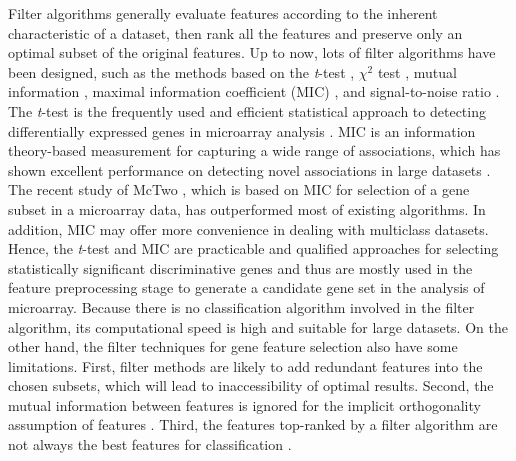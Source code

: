 \documentclass[10pt,journal,compsoc]{IEEEtran}
\begin{document}
	Filter algorithms generally evaluate features according to the inherent characteristic of a dataset, then rank all the features and preserve only an optimal subset of the original features. Up to now, lots of filter algorithms have been designed, such as the methods based on the \textit{t}-test \cite{W23}, $\chi^2$ test \cite{W21}, mutual information \cite{W22}, maximal information coefficient (MIC) \cite{W25}, and signal-to-noise ratio \cite{W24}. The \textit{t}-test is the frequently used and efficient statistical approach to detecting differentially expressed genes in microarray analysis \cite{RN413, RN414, RN421, RN417, RN418, RN419, RN416}. MIC is an information theory-based measurement for capturing a wide range of associations, which has shown excellent performance on detecting novel associations in large datasets \cite{W8}. The recent study of McTwo \cite{W16}, which is based on MIC for selection of a gene subset in a microarray data, has outperformed most of existing algorithms. In addition, MIC may offer more convenience in dealing with multiclass datasets. Hence, the \textit{t}-test and MIC are practicable and qualified approaches for selecting statistically significant discriminative genes and thus are mostly used in the feature preprocessing stage to generate a candidate gene set in the analysis of microarray. Because there is no classification algorithm involved in the filter algorithm, its computational speed is high and suitable for large datasets. On the other hand, the filter techniques for gene feature selection also have some limitations. First, filter methods are likely to add redundant features into the chosen subsets, which will lead to inaccessibility of optimal results. Second, the mutual information between features is ignored for the implicit orthogonality assumption of features \cite{P1}. Third, the features top-ranked by a filter algorithm are not always the best features for classification \cite{W16}.
	
\end{document}
